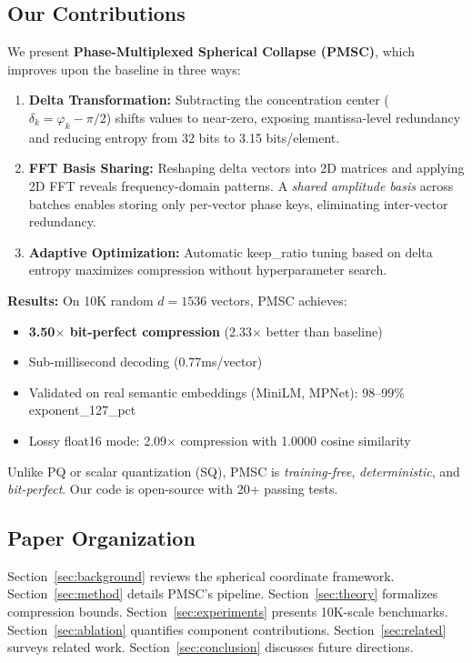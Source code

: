 \documentclass[11pt,a4paper]{article}
\begin{document}
\subsection{Our Contributions}

We present \textbf{Phase-Multiplexed Spherical Collapse (PMSC)}, which improves upon the baseline in three ways:

\begin{enumerate}
\item \textbf{Delta Transformation:} Subtracting the concentration center ($\delta_k = \varphi_k - \pi/2$) shifts values to near-zero, exposing mantissa-level redundancy and reducing entropy from 32 bits to 3.15 bits/element.
\item \textbf{FFT Basis Sharing:} Reshaping delta vectors into 2D matrices and applying 2D FFT reveals frequency-domain patterns. A \textit{shared amplitude basis} across batches enables storing only per-vector phase keys, eliminating inter-vector redundancy.
\item \textbf{Adaptive Optimization:} Automatic keep\_ratio tuning based on delta entropy maximizes compression without hyperparameter search.
\end{enumerate}

\textbf{Results:} On 10K random $d=1536$ vectors, PMSC achieves:
\begin{itemize}
\item \textbf{3.50$\times$ bit-perfect compression} (2.33$\times$ better than baseline)
\item Sub-millisecond decoding (0.77ms/vector)
\item Validated on real semantic embeddings (MiniLM, MPNet): 98--99\% exponent\_127\_pct
\item Lossy float16 mode: 2.09$\times$ compression with 1.0000 cosine similarity
\end{itemize}

Unlike PQ or scalar quantization (SQ), PMSC is \textit{training-free}, \textit{deterministic}, and \textit{bit-perfect}. Our code is open-source with 20+ passing tests.

\subsection{Paper Organization}

Section~\ref{sec:background} reviews the spherical coordinate framework. Section~\ref{sec:method} details PMSC's pipeline. Section~\ref{sec:theory} formalizes compression bounds. Section~\ref{sec:experiments} presents 10K-scale benchmarks. Section~\ref{sec:ablation} quantifies component contributions. Section~\ref{sec:related} surveys related work. Section~\ref{sec:conclusion} discusses future directions.
\end{document}
